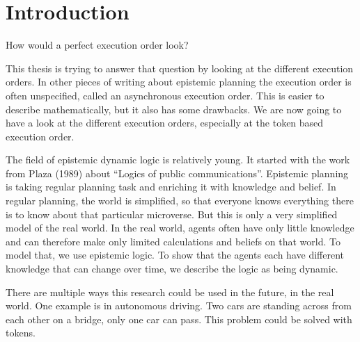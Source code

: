 \chapter{Introduction}\label{chap:introduction}

How would a perfect execution order look?


This thesis is trying to answer that question by looking at the different execution orders. In other pieces of writing  about epistemic planning the execution order is often unspecified, called an asynchronous execution order. This is easier to describe mathematically, but it also has some drawbacks. We are now going to have a look at the different execution orders, especially at the token based execution order.




The field of epistemic dynamic logic is relatively young. It started with the work from Plaza (1989) \cite{plaza1989logics} about ``Logics of public communications''.
Epistemic planning is taking regular planning task and enriching it with knowledge and belief. In regular planning, the world is simplified, so that everyone knows everything there is to know about that particular microverse. But this is only a very simplified model of the real world. In the real world, agents often have only little knowledge and can therefore make only limited calculations and beliefs on that world. To model that, we use epistemic logic. To show that the agents each have different knowledge that can change over time, we describe the logic as being dynamic.


There are multiple ways this research could be used in the future, in the real world. One example is in autonomous driving. Two cars are standing across from each other on a bridge, only one car can pass. This problem could be solved with tokens.

